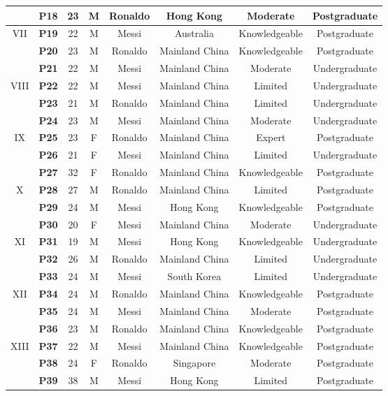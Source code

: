 \begin{table*}
\begin{tabular}{cccccccc}
       & \textbf{P18} & 23 & M & Ronaldo & Hong Kong & Moderate & Postgraduate\\
    \hline
    VII & \textbf{P19} & 22 & M & Messi & Australia & Knowledgeable & Postgraduate\\
       & \textbf{P20} & 23 & M & Ronaldo & Mainland China & Knowledgeable & Postgraduate\\
       & \textbf{P21} & 22 & M & Messi & Mainland China & Moderate & Undergraduate\\
    \hline
    VIII & \textbf{P22} & 22 & M & Messi & Mainland China & Limited & Undergraduate\\
       & \textbf{P23} & 21 & M & Ronaldo & Mainland China & Limited & Undergraduate\\
       & \textbf{P24} & 23 & M & Messi & Mainland China & Moderate & Undergraduate\\
    \hline
    IX & \textbf{P25} & 23 & F & Ronaldo & Mainland China & Expert & Postgraduate\\
       & \textbf{P26} & 21 & F & Messi & Mainland China & Limited & Undergraduate\\
       & \textbf{P27} & 32 & F & Ronaldo & Mainland China & Knowledgeable & Postgraduate\\
    \hline
    X  & \textbf{P28} & 27 & M & Ronaldo & Mainland China & Limited & Postgraduate\\
       & \textbf{P29} & 24 & M & Messi & Hong Kong & Knowledgeable & Postgraduate\\
       & \textbf{P30} & 20 & F & Messi & Mainland China & Moderate & Undergraduate\\
    \hline
    XI & \textbf{P31} & 19 & M & Messi & Hong Kong & Knowledgeable & Undergraduate\\
       & \textbf{P32} & 26 & M & Ronaldo & Mainland China & Limited & Undergraduate\\
       & \textbf{P33} & 24 & M & Messi & South Korea & Limited & Undergraduate\\
    \hline
    XII & \textbf{P34} & 24 & M & Ronaldo & Mainland China & Knowledgeable & Postgraduate\\
       & \textbf{P35} & 24 & M & Messi & Mainland China & Moderate & Postgraduate\\
       & \textbf{P36} & 23 & M & Ronaldo & Mainland China & Knowledgeable & Postgraduate\\
    \hline
    XIII & \textbf{P37} & 22 & M & Messi & Mainland China & Knowledgeable & Postgraduate\\
       & \textbf{P38} & 24 & F & Ronaldo & Singapore & Moderate & Postgraduate\\
       & \textbf{P39} & 38 & M & Messi & Hong Kong & Limited & Postgraduate\\
    \bottomrule
  \end{tabular}
\end{table*}

